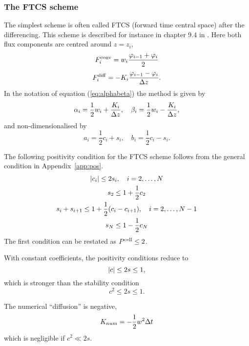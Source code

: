 \subsubsection{The FTCS scheme}

The simplest scheme is often called FTCS (forward time central space)
after the differencing. This scheme is described for instance in
chapter 9.4 in \cite{flet91}. Here both flux
components are centred around $z = z_i$,
\begin{equation}
  F^{\mathrm{conv}}_i = w_i \frac{\varphi_{i-1} + \varphi_i}{2}
\end{equation}
\begin{equation}\label{eq:centdifflux}
  F^{\mathrm{diff}}_i = - K_i \frac{\varphi_{i-1} - \varphi_i}{\Delta z} .
\end{equation}
In the notation of equation (\ref{eq:alphabeta}) the method is given by
\begin{equation}
   \alpha_i = \frac{1}{2} w_i + \frac{K_i}{\Delta z} , \quad 
   \beta_i  = \frac{1}{2} w_i - \frac{K_i}{\Delta z} ,
\end{equation}
and non-dimensionalised by
\begin{equation}
   a_i = \frac{1}{2} c_i + s_i , \quad 
   b_i = \frac{1}{2} c_i - s_i .
\end{equation}

The following positivity condition for the FTCS scheme follows from
the general condition in Appendix~\ref{app:pos}.
\begin{gather}
     |c_i| \le 2 s_i,  \quad i = 2, \dots, N \\
      s_2 \le 1 + \frac{1}{2} c_2 \\
  s_i + s_{i+1} \le 1 + \frac{1}{2} (c_i - c_{i+1}), \quad i = 2, \dots, N-1 \\ 
      s_N \le 1 - \frac{1}{2} c_N
\end{gather}
The first condition can be restated as $P^{\mathrm{cell}} \le 2$.

With constant coefficients, the positivity conditions reduce to
\begin{equation}
  |c| \le 2 s \le 1,
\end{equation}
which is stronger than the stability condition
\begin{equation}
  c^2 \le 2 s \le 1 .
\end{equation}

The numerical ``diffusion'' is negative, 
\begin{equation}
  K_{num} = - \frac{1}{2} w^2 \Delta t
\end{equation}
which is negligible if $c^2 \ll 2s$.

